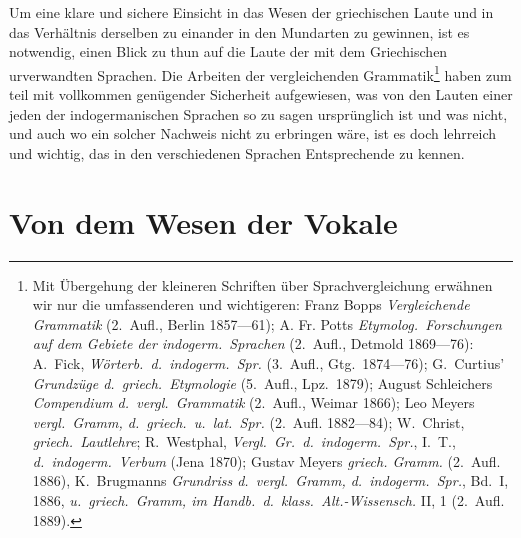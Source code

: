 
\renewcommand{\chaptitlefont}{\centering\large\bfseries\scshape}
\renewcommand{\chaptitlefont}{\centering\LARGE\bfseries\scshape}

Um eine klare und sichere Einsicht in das Wesen der griechischen Laute und in
das Verhältnis derselben zu einander in den Mundarten zu gewinnen, ist es
notwendig, einen Blick zu thun auf die Laute der mit dem Griechischen
urverwandten Sprachen. Die Arbeiten der vergleichenden Grammatik\footnote{%
Mit Übergehung der kleineren Schriften über Sprachvergleichung erwähnen wir nur
die umfassenderen und wichtigeren: Franz Bopps \emph{Vergleichende Grammatik}
(2.\ Aufl., Berlin 1857—61); A. Fr. Potts \emph{Etymolog.\ Forschungen auf dem
Gebiete der indogerm.\ Sprachen} (2.\ Aufl., Detmold 1869—76): A.\ Fick,
\emph{Wörterb.\ d.\ indogerm.\ Spr.} (3.\ Aufl., Gtg.\ 1874—76); G.\ Curtius'
\emph{Grundzüge d.\ griech.\ Etymologie} (5.\ Aufl., Lpz.\ 1879); August
Schleichers \emph{Compendium d.\ vergl.\ Grammatik} (2.\ Aufl., Weimar 1866);
Leo Meyers \emph{vergl.\ Gramm, d.\ griech.\ u.\ lat.\ Spr.} (2.\ Aufl.
1882—84); W.\ Christ, \emph{griech.\ Lautlehre}; R.\ Westphal, \emph{Vergl.\
Gr.\ d.\ indogerm.\ Spr.}, I.\ T., \emph{d.\ indogerm.\ Verbum} (Jena 1870);
Gustav Meyers \emph{griech. Gramm.} (2.\ Aufl. 1886), K.\ Brugmanns
\emph{Grundriss d.\ vergl.\ Gramm, d.\ indogerm.\ Spr.}, Bd.\ I, 1886, \emph{u.\
griech.\ Gramm, im Handb.\ d.\ klass.\ Alt.-Wissensch.} II, 1 (2.\ Aufl. 1889).

}
haben zum teil mit vollkommen genügender Sicherheit aufgewiesen, was von den
Lauten einer jeden der indogermanischen Sprachen so zu sagen ursprünglich ist
und was nicht, und auch wo ein solcher Nachweis nicht zu erbringen wäre, ist es
doch lehrreich und wichtig, das in den verschiedenen Sprachen Entsprechende zu
kennen.

\section{Von dem Wesen der Vokale}

